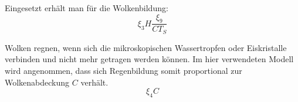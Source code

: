 \begin{refsection}
Eingesetzt erhält man für die Wolkenbildung:
\begin{equation}
\xi_3 H \frac{\xi_9}{C T_S}
\end{equation}

Wolken regnen, wenn sich die mikroskopischen Wassertropfen oder Eiskristalle verbinden und nicht mehr getragen werden können. Im hier verwendeten Modell wird angenommen, dass sich Regenbildung somit proportional zur Wolkenabdeckung $C$ verhält.
\begin{equation}
\xi_4 C
\end{equation}

%



\end{refsection}
